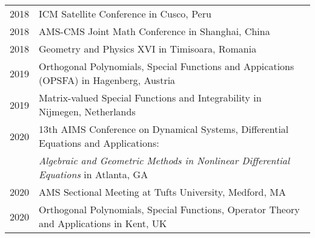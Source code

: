 \documentclass[11pt,letterpaper]{article}
\theoremstyle{definition}
\begin{document}
\begin{tabular}{ll}
2018 & ICM Satellite Conference in Cusco, Peru\\
2018 & AMS-CMS Joint Math Conference in Shanghai, China\\
2018 & Geometry and Physics XVI in Timisoara, Romania\\
2019 & Orthogonal Polynomials, Special Functions and Appications (OPSFA) in Hagenberg, Austria\\
2019 & Matrix-valued Special Functions and Integrability in Nijmegen, Netherlands\\
2020 & 13th AIMS Conference on Dynamical Systems, Differential Equations and Applications:\\
     & \textit{Algebraic and Geometric Methods in Nonlinear Differential Equations} in Atlanta, GA\\
2020 & AMS Sectional Meeting at Tufts University, Medford, MA\\
2020 & Orthogonal Polynomials, Special Functions, Operator Theory and Applications in Kent, UK
\end{tabular}
\end{document}
